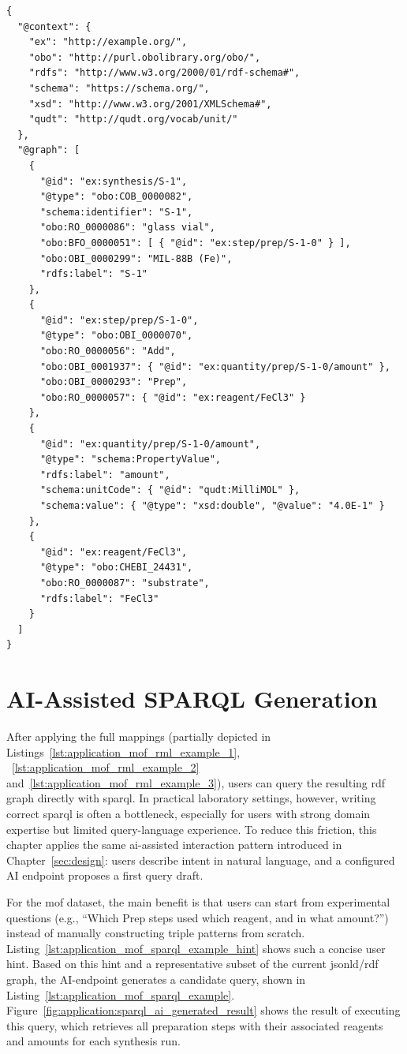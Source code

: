 \begin{lstlisting}[float=htbp,style=json, caption={Representative JSON-LD excerpt from the MOF synthesis dataset for \texttt{S-1}}, label={lst:application_mof_jsonld_example_s_1}]
{
  "@context": {
    "ex": "http://example.org/",
    "obo": "http://purl.obolibrary.org/obo/",
    "rdfs": "http://www.w3.org/2000/01/rdf-schema#",
    "schema": "https://schema.org/",
    "xsd": "http://www.w3.org/2001/XMLSchema#",
    "qudt": "http://qudt.org/vocab/unit/"
  },
  "@graph": [
    {
      "@id": "ex:synthesis/S-1",
      "@type": "obo:COB_0000082",
      "schema:identifier": "S-1",
      "obo:RO_0000086": "glass vial",
      "obo:BFO_0000051": [ { "@id": "ex:step/prep/S-1-0" } ],
      "obo:OBI_0000299": "MIL-88B (Fe)",
      "rdfs:label": "S-1"
    },
    {
      "@id": "ex:step/prep/S-1-0",
      "@type": "obo:OBI_0000070",
      "obo:RO_0000056": "Add",
      "obo:OBI_0001937": { "@id": "ex:quantity/prep/S-1-0/amount" },
      "obo:OBI_0000293": "Prep",
      "obo:RO_0000057": { "@id": "ex:reagent/FeCl3" }
    },
    {
      "@id": "ex:quantity/prep/S-1-0/amount",
      "@type": "schema:PropertyValue",
      "rdfs:label": "amount",
      "schema:unitCode": { "@id": "qudt:MilliMOL" },
      "schema:value": { "@type": "xsd:double", "@value": "4.0E-1" }
    },
    {
      "@id": "ex:reagent/FeCl3",
      "@type": "obo:CHEBI_24431",
      "obo:RO_0000087": "substrate",
      "rdfs:label": "FeCl3"
    }
  ]
}
\end{lstlisting}

\newpage

\section{AI-Assisted SPARQL Generation}

After applying the full mappings (partially depicted in Listings~\ref{lst:application_mof_rml_example_1}, ~\ref{lst:application_mof_rml_example_2} and~\ref{lst:application_mof_rml_example_3}), users can query the resulting \gls{rdf} graph directly with \gls{sparql}. In practical laboratory settings, however, writing correct \gls{sparql} is often a bottleneck, especially for users with strong domain expertise but limited query-language experience. To reduce this friction, this chapter applies the same \gls{ai}-assisted interaction pattern introduced in Chapter~\ref{sec:design}: users describe intent in natural language, and a configured AI endpoint proposes a first query draft.

For the \gls{mof} dataset, the main benefit is that users can start from experimental questions (e.g., ``Which Prep steps used which reagent, and in what amount?'') instead of manually constructing triple patterns from scratch. Listing~\ref{lst:application_mof_sparql_example_hint} shows such a concise user hint. Based on this hint and a representative subset of the current \gls{jsonld}/\gls{rdf} graph, the AI-endpoint generates a candidate query, shown in Listing~\ref{lst:application_mof_sparql_example}. Figure~\ref{fig:application:sparql_ai_generated_result} shows the result of executing this query, which retrieves all preparation steps with their associated reagents and amounts for each synthesis run.

